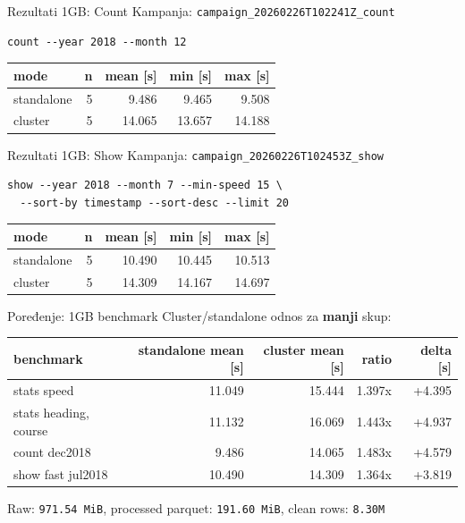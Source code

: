 \documentclass[aspectratio=169,11pt]{beamer}
\newcommand{\code}[1]{\texttt{\small #1}}
\begin{document}
\begin{frame}[fragile]{Rezultati 1GB: Count}
  Kampanja: \code{campaign\_20260226T102241Z\_count}

  \begin{verbatim}
count --year 2018 --month 12
  \end{verbatim}

  \begin{tabular}{lrrrr}
    \toprule
    mode & n & mean [s] & min [s] & max [s] \\
    \midrule
    standalone & 5 & 9.486 & 9.465 & 9.508 \\
    cluster & 5 & 14.065 & 13.657 & 14.188 \\
    \bottomrule
  \end{tabular}
\end{frame}

\begin{frame}[fragile]{Rezultati 1GB: Show}
  Kampanja: \code{campaign\_20260226T102453Z\_show}

  \scriptsize
  \begin{verbatim}
show --year 2018 --month 7 --min-speed 15 \
  --sort-by timestamp --sort-desc --limit 20
  \end{verbatim}
  \normalsize

  \begin{tabular}{lrrrr}
    \toprule
    mode & n & mean [s] & min [s] & max [s] \\
    \midrule
    standalone & 5 & 10.490 & 10.445 & 10.513 \\
    cluster & 5 & 14.309 & 14.167 & 14.697 \\
    \bottomrule
  \end{tabular}
\end{frame}

\begin{frame}{Poređenje: 1GB benchmark}
  Cluster/standalone odnos za \textbf{manji} skup:

  \vspace{0.25cm}
  \scriptsize
  \begin{tabular}{lrrrr}
    \toprule
    benchmark & standalone mean [s] & cluster mean [s] & ratio & delta [s] \\
    \midrule
    stats speed & 11.049 & 15.444 & 1.397x & +4.395 \\
    stats heading, course & 11.132 & 16.069 & 1.443x & +4.937 \\
    count dec2018 & 9.486 & 14.065 & 1.483x & +4.579 \\
    show fast jul2018 & 10.490 & 14.309 & 1.364x & +3.819 \\
    \bottomrule
  \end{tabular}
  \normalsize

  \vspace{0.3cm}
  Raw: \code{971.54 MiB}, processed parquet: \code{191.60 MiB}, clean rows: \code{8.30M}
\end{frame}
\end{document}
